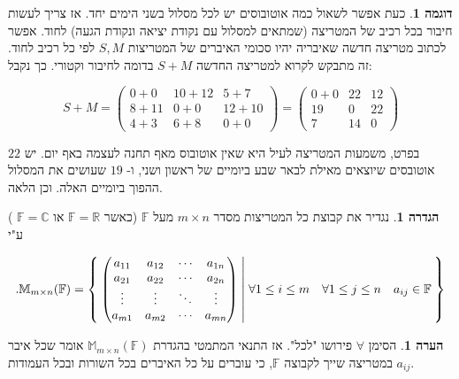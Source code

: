 \documentclass[12pt]{report}
\theoremstyle{plain}
\theoremstyle{definition}
\newtheorem{definition}[theorem]{הגדרה}
\newtheorem{example}{דוגמה}[chapter]
\newtheorem{remark}{הערה}[chapter]
\newcommand{\R}{\mathbb{R}}
\newcommand{\C}{\mathbb{C}}
\newcommand{\F}{\mathbb{F}}
\newcommand{\M}{\mathbb{M}}
\newcommand{\0}{\mathbf{0}}
\begin{document}
\begin{example}
כעת אפשר לשאול כמה אוטובוסים יש לכל מסלול בשני הימים יחד. אז צריך לעשות חיבור בכל רכיב של המטריצה (שמתאים למסלול עם נקודת יציאה ונקודת הגעה) לחוד. אפשר לכתוב מטריצה חדשה שאיבריה יהיו סכומי האיברים של המטריצות
$S,M$
לפי כל רכיב לחוד. זה מתבקש לקרוא למטריצה החדשה 
$S+M$
בדומה לחיבור וקטורי. כך נקבל:

$$
S+M=\left(
\begin{array}{ccc}
0+0 & 10+12 & 5+7 \\
8+11 & 0+0 & 12+10 \\
4+3 & 6+8 & 0+0
\end{array}
\right)
=\left(
\begin{array}{ccc}
0+0 & 22 & 12 \\
19 & 0 & 22 \\
7 & 14 & 0
\end{array}
\right)
$$

בפרט, משמעות המטריצה לעיל היא שאין אוטובוס מאף תחנה לעצמה באף יום. יש
$22$
אוטובסים שיוצאים מאילת לבאר שבע ביומיים של ראשון ושני, ו-
$19$
שעושים את המסלול ההפוך ביומיים האלה. וכן הלאה.

\end{example}

\begin{definition}
\adddeftolist{מרחב המטריצות $\M_{m\times n}(\F)$}
נגדיר את קבוצת כל המטריצות מסדר 
$m\times n$
מעל
$\F$
(כאשר
$\F=\R$
או
$\F=\C$
)
ע"י 

$$
.\M_{m\times n}(\F)=\Set{\begin{pmatrix}a_{11} & a_{12} & \cdots & a_{1n}\\
a_{21} & a_{22} & \cdots & a_{2n}\\
\vdots & \vdots & \ddots & \vdots\\
a_{m1} & a_{m2} & \cdots & a_{mn}
\end{pmatrix}|\forall 1\leq i\leq m \quad \forall 1\leq j\leq n \quad a_{ij}\in \F}
$$

\end{definition}

\begin{remark}
הסימן 
$\forall$
פירושו "לכל". אז התנאי המתמטי בהגדרת 
$\M_{m\times n}(\F)$
אומר שכל איבר 
$a_{ij}$
במטריצה שייך לקבוצה 
$\F$,
כי עוברים על כל האיברים בכל השורות ובכל העמודות.
\end{remark}
\end{document}

